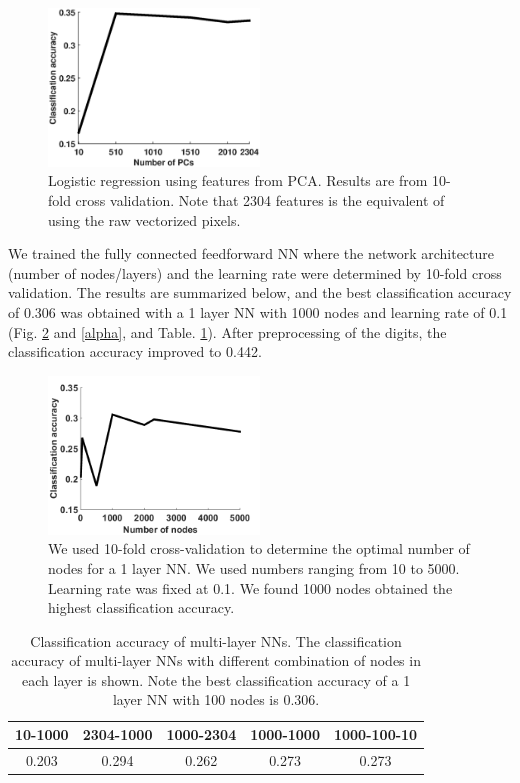 \documentclass[conference]{IEEEtran}
\begin{document}
\begin{figure}[H]
\centering
\includegraphics[width=0.5\textwidth]{lrpca.eps}
\caption{\scriptsize Logistic regression using features from PCA. Results are from 10-fold cross validation. Note that 2304 features is the equivalent of using the raw vectorized pixels.}
\label{lr}
\end{figure}

We trained the fully connected feedforward NN where the network architecture (number of nodes/layers) and the learning rate were determined by 10-fold cross validation. The results are summarized below, and the best classification accuracy of 0.306 was obtained with a 1 layer NN with 1000 nodes and learning rate of 0.1 (Fig. \ref{node} and \ref{alpha}, and Table. \ref{layer}). After preprocessing of the digits, the classification accuracy improved to 0.442.

\begin{figure}[H]
\centering
\includegraphics[width=0.5\textwidth]{nNode.png}
\caption{\scriptsize We used 10-fold cross-validation to determine the optimal number of nodes for a 1 layer NN. We used numbers ranging from 10 to 5000. Learning rate was fixed at 0.1. We found 1000 nodes obtained the highest classification accuracy.}
\label{node}
\end{figure}

\begin{table}[htbp]
\footnotesize
\centering
\caption{\footnotesize Classification accuracy of multi-layer NNs. The classification accuracy of multi-layer NNs with different combination of nodes in each layer is shown. Note the best classification accuracy of a 1 layer NN with 100 nodes is 0.306.}
\begin{tabular}{|c|c|c|c|c|}
\hline
10-1000 & 2304-1000 & 1000-2304 & 1000-1000 & 1000-100-10 \\
\hline
0.203 & 0.294 & 0.262 & 0.273 & 0.273 \\
\hline
\end{tabular}
\label{layer}
\end{table}
\normalsize
\end{document}

